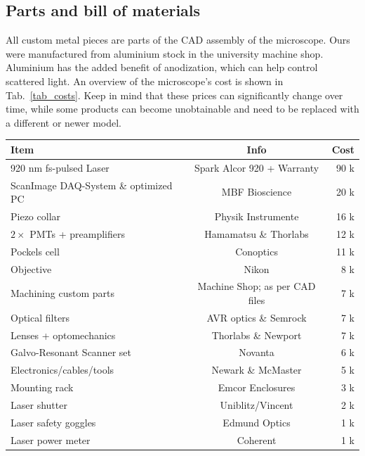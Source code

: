 \documentclass[10pt,letterpaper]{article}
\begin{document}
\subsection{Parts and bill of materials}
All custom metal pieces are parts of the CAD assembly of the microscope. Ours were manufactured from aluminium stock in the university machine shop. Aluminium has the added benefit of anodization, which can help control scattered light. An overview of the microscope's cost is shown in Tab.~\ref{tab_costs}. Keep in mind that these prices can significantly change over time, while some products can become unobtainable and need to be replaced with a different or newer model.
%
\begin{table}
\begin{center}
  \begin{tabular}{ l c r } \hline
   \textbf{Item} & \textbf{Info} & \textbf{Cost} \\ \hline
\rowcolor{gray!20} 920 nm fs-pulsed Laser  & Spark Alcor 920 + Warranty & 90 k \\
                   ScanImage DAQ-System \& optimized PC & MBF Bioscience& 20 k \\
\rowcolor{gray!20} Piezo collar & Physik Instrumente & 16 k	\\
            $2\times$ PMTs + preamplifiers  & Hamamatsu \& Thorlabs & 12 k \\
\rowcolor{gray!20} Pockels cell             & Conoptics &	11 k \\
                   Objective                & Nikon &  8 k \\
\rowcolor{gray!20} Machining custom parts   & Machine Shop; as per CAD files &  7 k \\
                   Optical filters          & AVR optics \& Semrock &  7 k \\
\rowcolor{gray!20} Lenses + optomechanics   & Thorlabs \& Newport &  7 k \\
                   Galvo-Resonant Scanner set & Novanta &  6 k \\
\rowcolor{gray!20} Electronics/cables/tools & Newark \& McMaster &  5 k \\
                   Mounting rack            & Emcor Enclosures &  3 k \\
\rowcolor{gray!20} Laser shutter            & Uniblitz/Vincent &  2 k \\
                   Laser safety goggles     & Edmund Optics &  1 k \\
\rowcolor{gray!20} Laser power meter        & Coherent &  1 k \\

\end{tabular}
\end{center}
\end{table}
\end{document}
